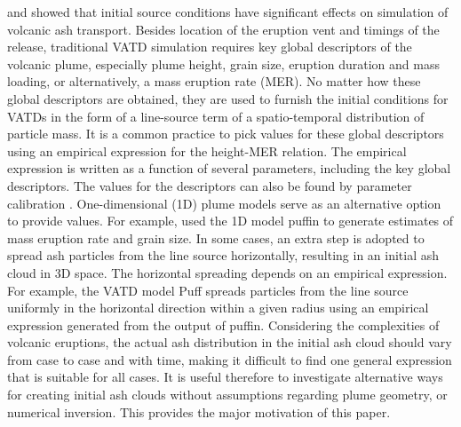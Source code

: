 \documentclass[utf8]{frontiersSCNS} %
\begin{document}
\citet{fero2009simulating} and \citet{stohl2011determination} showed that initial source conditions have significant effects on simulation of volcanic ash transport. Besides  location of the eruption vent and timings of the release, traditional VATD simulation requires key global descriptors of the volcanic plume, especially plume height, grain size, eruption duration and mass loading, or alternatively, a mass eruption rate (MER). No matter how these global descriptors are obtained, they are used to furnish the initial conditions for VATDs in the form of a line-source term of a spatio-temporal distribution of particle mass. It is a common practice to pick values for these global descriptors using an empirical expression for the height-MER relation. The empirical expression is written as a function of several parameters, including the key global descriptors. The values for the descriptors can also be found by parameter calibration \citep[e.g.][]{fero2008simulation,fero2009simulating, stohl2011determination, zidikheri2017estimation}. One-dimensional (1D) plume models serve as an alternative option to provide values. For example, \citet{bursik2012estimation} used the 1D model puffin \citep{bursik2001effect} to generate estimates of mass eruption rate and grain size. In some cases, an extra step is adopted to spread ash particles from the line source horizontally, resulting in an initial ash cloud in 3D space. The horizontal spreading depends on an empirical expression. For example, the VATD model Puff spreads particles from the line source uniformly in the horizontal direction within a given radius using an empirical expression generated from the output of puffin. Considering the complexities of volcanic eruptions, the actual ash distribution in the initial ash cloud should vary from case to case and with time, making it difficult to find one general expression that is suitable for all cases. It is useful therefore to investigate alternative ways for creating initial ash clouds without assumptions regarding plume geometry, or numerical inversion. This provides the major motivation of this paper.
\end{document}
